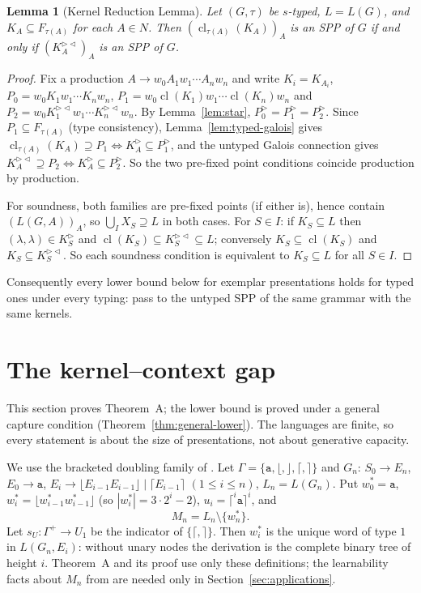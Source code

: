 \documentclass[11pt]{article}
\numberwithin{equation}{section}
\theoremstyle{plain}
\newtheorem{lemma}[theorem]{Lemma}
\theoremstyle{definition}
\theoremstyle{remark}
\theoremstyle{plain}
\newcommand{\eps}{\lambda}
\newcommand{\R}{^{\rhd}}
\newcommand{\RL}{^{\rhd\lhd}}
\newcommand{\cl}{\operatorname{cl}}
\newcommand{\Lfl}{\lfloor}
\newcommand{\Rfl}{\rfloor}
\newcommand{\Lce}{\lceil}
\newcommand{\Rce}{\rceil}
\newcommand{\ta}{\mathtt a}
\begin{document}
\begin{lemma}[Kernel Reduction Lemma]\label{lem:reduction}
Let $(G,\tau)$ be $s$-typed, $L=L(G)$, and $K_A\subseteq F_{\tau(A)}$ for
each $A\in N$.  Then $(\cl_{\tau(A)}(K_A))_A$ is an SPP of $G$ if and only if
$(K_A\RL)_A$ is an SPP of $G$.
\end{lemma}
\begin{proof}
Fix a production $A\to w_0A_1w_1\cdots A_nw_n$ and write $K_i=K_{A_i}$,
$P_0=w_0K_1w_1\cdots K_nw_n$, $P_1=w_0\cl(K_1)w_1\cdots\cl(K_n)w_n$ and
$P_2=w_0K_1\RL w_1\cdots K_n\RL w_n$.  By Lemma~\ref{lem:star},
$P_0\R=P_1\R=P_2\R$.  Since $P_1\subseteq F_{\tau(A)}$ (type consistency),
Lemma~\ref{lem:typed-galois} gives
$\cl_{\tau(A)}(K_A)\supseteq P_1\iff K_A\R\subseteq P_1\R$, and the untyped
Galois connection gives $K_A\RL\supseteq P_2\iff K_A\R\subseteq P_2\R$.  So the
two pre-fixed point conditions coincide production by production.

For soundness, both families are pre-fixed points (if either is), hence
contain $(L(G,A))_A$, so $\bigcup_I X_S\supseteq L$ in both cases.  For
$S\in I$: if $K_S\subseteq L$ then $(\eps,\eps)\in K_S\R$ and
$\cl(K_S)\subseteq K_S\RL\subseteq L$; conversely $K_S\subseteq\cl(K_S)$ and
$K_S\subseteq K_S\RL$.  So each soundness condition is equivalent to
$K_S\subseteq L$ for all $S\in I$.
\end{proof}
Consequently every lower bound below for exemplar presentations holds for
typed ones under every typing: pass to the untyped SPP of the same grammar
with the same kernels.

\section{The kernel--context gap}\label{sec:deletion}

This section proves Theorem~A; the lower bound is proved under a general
capture condition (Theorem~\ref{thm:general-lower}).  The languages are finite, so every
statement is about the size of presentations, not about generative
capacity.

We use the bracketed doubling family of \citet[Sec.~6]{kuriyama-tcs1}.
Let $\Gamma=\{\ta,\Lfl,\Rfl,\Lce,\Rce\}$ and $G_n$:
$S_0\to E_n$, $E_0\to\ta$, $E_i\to\Lfl E_{i-1}E_{i-1}\Rfl\mid\Lce E_{i-1}\Rce$
$(1\le i\le n)$, $L_n=L(G_n)$.  Put $w^*_0=\ta$,
$w^*_i=\Lfl w^*_{i-1}w^*_{i-1}\Rfl$ (so $|w^*_i|=3\cdot2^i-2$),
$u_i=\Lce^i\ta\Rce^i$, and
\[
M_n=L_n\setminus\{w^*_n\}.
\]
Let $s_U:\Gamma^+\to U_1$ be the indicator of $\{\Lce,\Rce\}$.  Then
$w^*_i$ is the unique word of type $1$ in $L(G_n,E_i)$: without unary
nodes the derivation is the complete binary tree of height $i$.  Theorem~A
and its proof use only these definitions; the learnability facts about $M_n$
from \citet{kuriyama-tcs1} are needed only in Section~\ref{sec:applications}.
\end{document}
